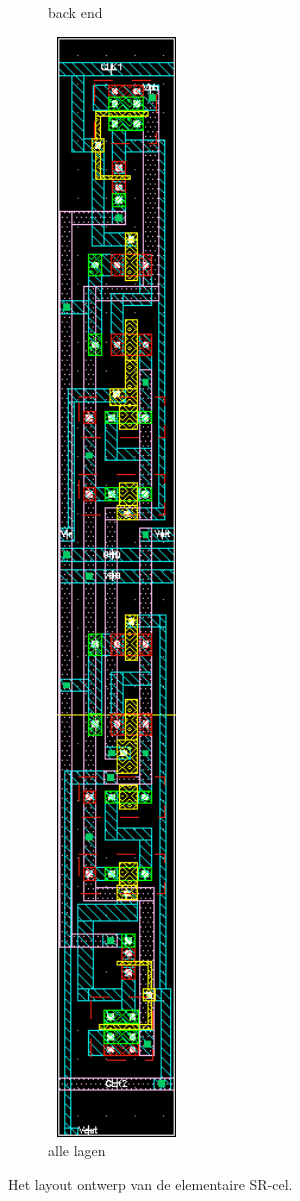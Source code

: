 \documentclass[11pt,a4paper,oneside,dutch]{article}
\begin{document}
\begin{figure}[htp]
\begin{subfigure}[b]{0.25\textwidth}
		\caption{back end}
	\end{subfigure}
	\begin{subfigure}[b]{0.25\textwidth}
		\centering
		\includegraphics[width=0.4\textwidth]{elementary_all.png}
		\caption{alle lagen}
	\end{subfigure}
	
	\caption{Het layout ontwerp van de elementaire SR-cel.}
	\label{fig:elementary}
\end{figure}
\end{document}
